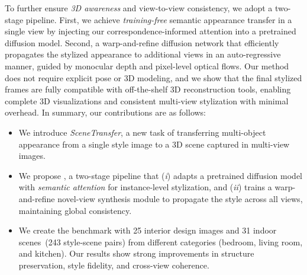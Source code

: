 To further ensure \emph{3D awareness} and view-to-view consistency, we adopt a two-stage pipeline.
First, we achieve \emph{training-free} semantic appearance transfer in a single view by injecting our correspondence-informed attention into a pretrained diffusion model.
Second, a warp-and-refine diffusion network that efficiently propagates the stylized appearance to additional views in an auto-regressive manner, guided by monocular depth and pixel-level optical flows.
Our method does not require explicit pose or 3D modeling, and we show that the final stylized frames are fully compatible with off-the-shelf 3D reconstruction tools, enabling complete 3D visualizations and consistent multi-view stylization with minimal overhead.
In summary, our contributions are as follows:
\begin{itemize}
    \item We introduce \emph{SceneTransfer}, a new task of transferring multi-object appearance from a single style image to a 3D scene captured in multi-view images.
    \item We propose \ours, a two-stage pipeline that (\emph{i}) adapts a pretrained diffusion model with \emph{semantic attention} for instance-level stylization, and (\emph{ii}) trains a warp-and-refine novel-view synthesis module to propagate the style across all views, maintaining global consistency.
    \item We create the \dataset benchmark with 25 interior design images and 31 indoor scenes~(243 style-scene pairs) from different categories (\eg bedroom, living room, and kitchen). Our results show strong improvements in structure preservation, style fidelity, and cross-view coherence.
\end{itemize}
